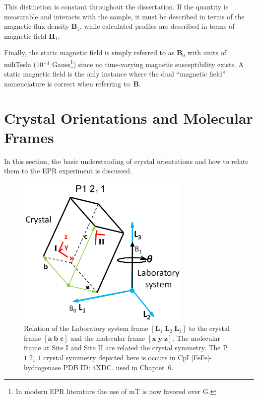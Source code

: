 This distinction is constant throughout the dissertation. If the quantity is measurable and interacts with the sample, it must be described in terms of the magnetic flux density $\mathbf{B}_1$, while calculated profiles are described in terms of magnetic field $\mathbf{H}_1$.

Finally, the static magnetic field is simply referred to as $\mathbf{B}_0$ with units of miliTesla (10$^{-1}$ Gauss\footnote{In modern EPR literature the use of mT is now favored over G.}) since no time-varying magnetic susceptibility exists. A static magnetic field is the only instance where the dual ``magnetic field'' nomenclature is correct when referring to~$\mathbf{B}$.

\section{Crystal Orientations and Molecular Frames}
In this section, the basic understanding of crystal orientations and how to relate them to the EPR experiment is discussed. 

\begin{figure}[ht]
 \centering
 \includegraphics[width=0.75\textwidth]{Kapitel/Ch1-images/CrystalRotation.eps}
 \caption[Single crystal EPR frames.]{Relation of the Laboratory system frame $[\mathbf{L}_1\; \mathbf{L}_2\; \mathbf{L}_3]$ to the crystal frame $[\mathbf{a}\; \mathbf{b}\; \mathbf{c}]$ and the molecular frame $[\mathbf{x}\; \mathbf{y}\; \mathbf{z}]$. The molecular frame at Site I and Site II are related the crystal symmetry. The P$1\;2_1\;1$ crystal symmetry depicted here is occurs in CpI [FeFe]-hydrogenase PDB ID: 4XDC.\cite{FeFeCry} used in Chapter~6.}
 \label{fig:CrystalOrientation}
\end{figure}

